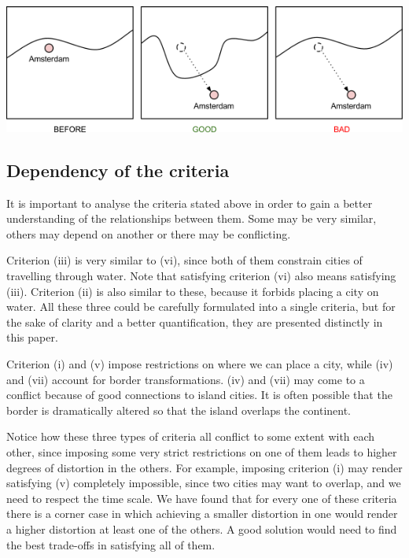\documentclass[a4paper,11pt]{article}
\begin{document}
\begin{enumerate}[(i)]
    \begin{center}
        \includegraphics[width=\textwidth]{crit7.png}
    \end{center}

\end{enumerate}

\subsection{Dependency of the criteria}
It is important to analyse the criteria stated above in order to gain a better understanding of
the relationships between them. Some may be very similar, others may depend on another
or there may be conflicting.

Criterion (iii) is very similar to (vi), since both of them constrain cities of travelling through
water. Note that satisfying criterion (vi) also means satisfying (iii). Criterion (ii) is also
similar to these, because it forbids placing a city on water. All these three could be carefully
formulated into a single criteria, but for the sake of clarity and a better quantification, they are
presented distinctly in this paper.

Criterion (i) and (v) impose restrictions on where we can place a city, while (iv) and (vii)
account for border transformations. (iv) and (vii) may come to a conflict because of good
connections to island cities. It is often possible that the border is dramatically altered so that
the island overlaps the continent.

Notice how these three types of criteria all conflict to some extent with each other, since
imposing some very strict restrictions on one of them leads to higher degrees of distortion
in the others. For example, imposing criterion (i) may render satisfying (v) completely
impossible, since two cities may want to overlap, and we need to respect the time scale. We
have found that for every one of these criteria there is a corner case in which achieving a
smaller distortion in one would render a higher distortion at least one of the others. A good
solution would need to find the best trade-offs in satisfying all of them.
\end{document}
